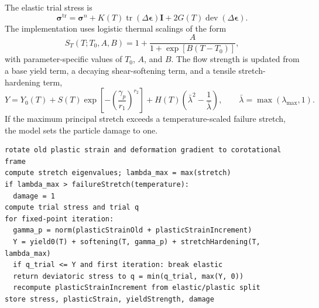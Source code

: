 The elastic trial stress is
\begin{equation}
  \boldsymbol{\sigma}^{\mathrm{tr}} = \boldsymbol{\sigma}^{n}
  + K(T)\operatorname{tr}(\Delta\boldsymbol{\epsilon})\mathbf{I}
  + 2G(T)\operatorname{dev}(\Delta\boldsymbol{\epsilon}).
\end{equation}
The implementation uses logistic thermal scalings of the form
\begin{equation}
  S_T(T;T_0,A,B)=1+\frac{A}{1+\exp[B(T-T_0)]},
  \label{eq:polymer-thermal-scale}
\end{equation}
with parameter-specific values of \(T_0\), \(A\), and \(B\).  The flow strength is updated from a base yield term, a decaying shear-softening term, and a tensile stretch-hardening term,
\begin{equation}
  Y = Y_0(T)
  + S(T)\exp\left[-\left(\frac{\gamma_p}{r_1}\right)^{r_2}\right]
  + H(T)\left(\bar{\lambda}^{2}-\frac{1}{\bar{\lambda}}\right),
  \qquad
  \bar{\lambda}=\max(\lambda_{\max},1).
  \label{eq:polymer-flow-strength}
\end{equation}
If the maximum principal stretch exceeds a temperature-scaled failure stretch, the model sets the particle damage to one.

\begin{lstlisting}[caption={StrainHardeningPolymer update structure.},label={alg:polymer-update},basicstyle=\ttfamily\small]
rotate old plastic strain and deformation gradient to corotational frame
compute stretch eigenvalues; lambda_max = max(stretch)
if lambda_max > failureStretch(temperature):
  damage = 1
compute trial stress and trial q
for fixed-point iteration:
  gamma_p = norm(plasticStrainOld + plasticStrainIncrement)
  Y = yield0(T) + softening(T, gamma_p) + stretchHardening(T, lambda_max)
  if q_trial <= Y and first iteration: break elastic
  return deviatoric stress to q = min(q_trial, max(Y, 0))
  recompute plasticStrainIncrement from elastic/plastic split
store stress, plasticStrain, yieldStrength, damage
\end{lstlisting}


\subsubsection{}
\label{subsubsec:surface-informed-polymer-model}

